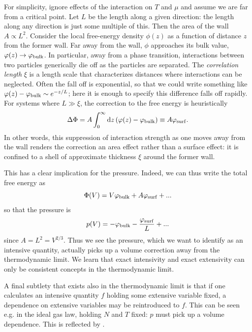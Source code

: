For simplicity, ignore effects of the interaction on $T$ and $\mu$ and assume we
are far from a critical point. 
Let $L$ be the length along a given direction: the length along
any direction is just some multiple of this. Then the area of the wall $A\propto
L^2$. Consider the local free-energy density $\phi(z)$ as a function of distance
$z$ from the former wall. Far away from the wall, $\phi$ approaches its bulk
value, $\phi(z)\to\phi_{\rm bulk}$. In particular, away from a phase
transition, interactions between two particles generically die off as the
particles are separated. The {\it correlation length}
 $\xi$ is a length scale
that characterizes distances where interactions can be neglected. Often the fall
off is exponential, so that we could write something like $\phi(z)-\phi_{\rm
bulk}\sim e^{-z/L}$; here it is enough to specify this difference falls off
rapidly. For systems where $L\gg\xi$, the correction to the free energy is
heuristically
\begin{equation}
\Delta\Phi=A\int_0^\infty\dd{z}\left(\phi(z)-\phi_{\rm bulk}\right)\equiv
A\phi_{\rm surf}.
\end{equation}
In other words, this suppression of interaction strength as one moves away from
the wall renders the correction an area effect rather than a surface effect: it
is confined to a shell of approximate thickness $\xi$ around the former wall.

This has a clear implication for the pressure. Indeed, we can thus write the
total free energy as
\begin{equation}
\Phi(V)=V\phi_{\rm bulk}+A\phi_{\rm surf}+...
\end{equation}
so that the pressure is
\begin{equation}
p(V)=-\phi_{\rm bulk}-\frac{\phi_{\rm surf}}{L}+...
\end{equation}
since $A=L^2=V^{2/3}$. Thus we see the pressure, which we want to identify as an
intensive quantity, actually picks up a volume correction away from the
thermodynamic limit. We learn that exact intensivity and exact extensivity can
only be consistent concepts in the thermodynamic limit.

A final subtlety that exists also in the thermodynamic limit is that if one
calculates an intensive quantity $f$ holding some extensive variable fixed, a
dependence on extensive variables may be reintroduced to $f$. This can be seen
e.g. in the ideal gas law, holding $N$ and $T$ fixed: $p$ must pick up a volume
dependence. This is reflected by .

